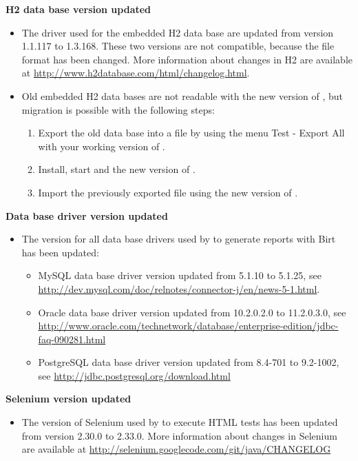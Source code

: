 %

\textbf{H2 data base version updated}
\begin{itemize}
\item The driver used for the embedded H2 data base are updated from version
    1.1.117 to 1.3.168. These two versions are not compatible, because the file format
    has been changed. More information about changes in H2 are
    available at \url{http://www.h2database.com/html/changelog.html}.
\item Old embedded H2 data bases are not readable with the new version
    of \ite, but migration is possible with the following steps:
    \begin{enumerate}
        \item Export the old data base into a file by using the menu
            Test - Export All with your working version of \ite.
        \item Install, start and the new version of \ite.
        \item Import the previously exported file using the new version
            of \ite.
    \end{enumerate}
\end{itemize}

\textbf{Data base driver version updated}
\begin{itemize}
\item The version for all data base drivers used by \ite to generate reports
    with Birt has been updated:
    \begin{itemize}
    \item MySQL data base driver version updated from 5.1.10 to 5.1.25,
        see \url{http://dev.mysql.com/doc/relnotes/connector-j/en/news-5-1.html}.
    \item Oracle data base driver version updated from 10.2.0.2.0 to 11.2.0.3.0,
        see \url{http://www.oracle.com/technetwork/database/enterprise-edition/jdbc-faq-090281.html}
    \item PostgreSQL data base driver version updated from 8.4-701 to 9.2-1002,
        see \url{http://jdbc.postgresql.org/download.html}
    \end{itemize}
\end{itemize}

\textbf{Selenium version updated}
\begin{itemize}
\item The version of Selenium used by \ite to execute HTML tests has been
    updated from version 2.30.0 to 2.33.0. More information about changes
    in Selenium are available at
    \url{http://selenium.googlecode.com/git/java/CHANGELOG}
\end{itemize}

